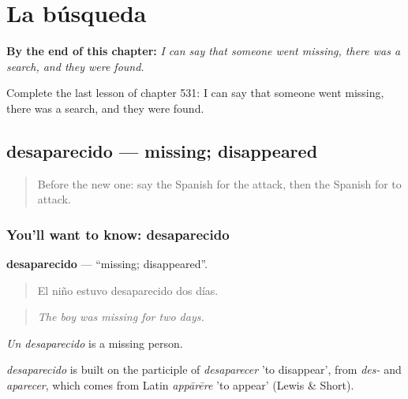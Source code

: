 
\chapter{La búsqueda}
\label{ch:es-la-busqueda}

\begin{chapteropening}
\textbf{By the end of this chapter:} \emph{I can say that someone went missing, there was a search, and they were found.}

Complete the last lesson of chapter 531: I can say that someone went missing, there was a search, and they were found.
\end{chapteropening}

\section[desaparecido]{desaparecido — missing; disappeared}

\label{lesson:ES-C531-desaparecido}



\begin{quote}
Before the new one: say the Spanish for the attack, then the Spanish for to attack.
\end{quote}

\subsection*{You'll want to know: desaparecido}
\textbf{desaparecido} — \textquotedblleft{}missing; disappeared\textquotedblright{}.

\begin{quote}
El niño estuvo desaparecido dos días.
\end{quote}

\begin{quote}
\emph{The boy was missing for two days.}
\end{quote}

\emph{Un desaparecido} is a missing person.

\begin{cousinweb}
\emph{desaparecido} is built on the participle of \emph{desaparecer} 'to disappear', from \emph{des-} and \emph{aparecer}, which comes from Latin \emph{appārēre} 'to appear' (Lewis \& Short).
\end{cousinweb}

